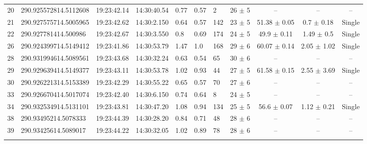 \begin{table}[htbp!]
\begin{tabular}{llllllllccc}
20  &  290.925572814.5112608  &  19:23:42.14  &  14:30:40.54  &  0.77  &  0.57  &  2  &  26 $\pm$ 5  &  --  &  --  &  -- \\
21  &  290.927575714.5005965  &  19:23:42.62  &  14:30:2.150  &  0.64  &  0.57  &  142  &  23 $\pm$ 5  &  51.38 $\pm$ 0.05  &  0.7 $\pm$ 0.18  &  Single \\
22  &  290.927781414.500986  &  19:23:42.67  &  14:30:3.550  &  0.8  &  0.69  &  174  &  24 $\pm$ 5  &  49.9 $\pm$ 0.11  &  1.49 $\pm$ 0.5  &  Single \\
26  &  290.924399714.5149412  &  19:23:41.86  &  14:30:53.79  &  1.47  &  1.0  &  168  &  29 $\pm$ 6  &  60.07 $\pm$ 0.14  &  2.05 $\pm$ 1.02  &  Single \\
28  &  290.931994614.5089561  &  19:23:43.68  &  14:30:32.24  &  0.63  &  0.54  &  65  &  30 $\pm$ 6  &  --  &  --  &  -- \\
29  &  290.929639414.5149377  &  19:23:43.11  &  14:30:53.78  &  1.02  &  0.93  &  44  &  27 $\pm$ 5  &  61.58 $\pm$ 0.15  &  2.55 $\pm$ 3.69  &  Single \\
30  &  290.926221314.5153389  &  19:23:42.29  &  14:30:55.22  &  0.65  &  0.57  &  70  &  27 $\pm$ 6  &  --  &  --  &  -- \\
33  &  290.926670414.5017074  &  19:23:42.40  &  14:30:6.150  &  0.74  &  0.64  &  8  &  24 $\pm$ 5  &  --  &  --  &  -- \\
34  &  290.932534914.5131101  &  19:23:43.81  &  14:30:47.20  &  1.08  &  0.94  &  134  &  25 $\pm$ 5  &  56.6 $\pm$ 0.07  &  1.12 $\pm$ 0.21  &  Single \\
38  &  290.93495214.5078333  &  19:23:44.39  &  14:30:28.20  &  0.84  &  0.71  &  48  &  28 $\pm$ 6  &  --  &  --  &  -- \\
39  &  290.93425614.5089017  &  19:23:44.22  &  14:30:32.05  &  1.02  &  0.89  &  78  &  28 $\pm$ 6  &  --  &  --  &  -- \\
\hline \noalign {\smallskip}
\end{tabular}
\end{table}


